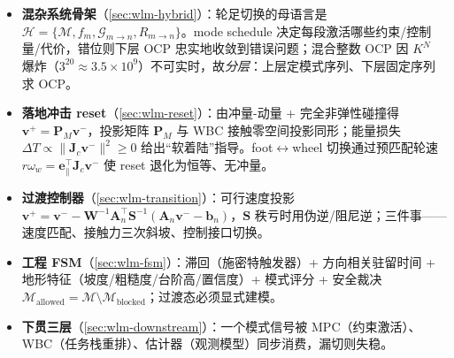 \begin{itemize}
  \item \textbf{混杂系统骨架}（\cref{sec:wlm-hybrid}）：轮足切换的母语言是 $\mathcal H=\{\mathcal M,f_m,\mathcal G_{m\to n},R_{m\to n}\}$。mode schedule 决定每段激活哪些约束/控制量/代价，错位则下层 OCP 忠实地收敛到错误问题；混合整数 OCP 因 $K^N$ 爆炸（$3^{20}\approx3.5\times10^9$）不可实时，故\emph{分层}：上层定模式序列、下层固定序列求 OCP。
  \item \textbf{落地冲击 reset}（\cref{sec:wlm-reset}）：由冲量-动量 + 完全非弹性碰撞得 $\mathbf v^+=\mathbf P_M\mathbf v^-$，投影矩阵 $\mathbf P_M$ 与 WBC 接触零空间投影同形；能量损失 $\Delta T\propto\|\mathbf J_c\mathbf v^-\|^2\ge0$ 给出“软着陆”指导。foot$\leftrightarrow$wheel 切换通过预匹配轮速 $r\omega_w=\mathbf e_\parallel^\top\mathbf J_c\mathbf v^-$ 使 reset 退化为恒等、无冲量。
  \item \textbf{过渡控制器}（\cref{sec:wlm-transition}）：可行速度投影 $\mathbf v^+=\mathbf v^--\mathbf W^{-1}\mathbf A_n^\top\mathbf S^{-1}(\mathbf A_n\mathbf v^--\mathbf b_n)$，$\mathbf S$ 秩亏时用伪逆/阻尼逆；三件事——速度匹配、接触力三次斜坡、控制接口切换。
  \item \textbf{工程 FSM}（\cref{sec:wlm-fsm}）：滞回（施密特触发器）+ 方向相关驻留时间 + 地形特征（坡度/粗糙度/台阶高/置信度）+ 模式评分 + 安全裁决 $\mathcal M_{\mathrm{allowed}}=\mathcal M\setminus\mathcal M_{\mathrm{blocked}}$；过渡态必须显式建模。
  \item \textbf{下贯三层}（\cref{sec:wlm-downstream}）：一个模式信号被 MPC（约束激活）、WBC（任务栈重排）、估计器（观测模型）同步消费，漏切则失稳。
\end{itemize}


